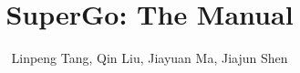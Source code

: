 \documentclass{article}
\theoremstyle{definition}
\theoremstyle{remark}
\numberwithin{equation}{section}
\begin{document}

\title{SuperGo: The Manual}
\author{Linpeng Tang, Qin Liu, Jiayuan Ma, Jiajun Shen}
\maketitle



\end{document}

